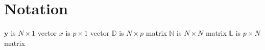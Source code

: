 \section{Notation}
$\mathbf{y}$ is $N\times1$ vector
$x$ is $p\times1$ vector
$\mathbb{D}$ is $N\times p$ matrix
$\mathbb{N}$ is $N\times N$ matrix
$\mathbb{L}$ is $p\times N$ matrix